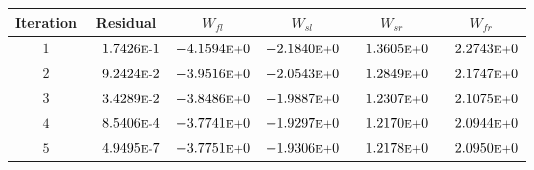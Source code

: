 \begin{tabular*}{\textwidth}{@{\extracolsep{\fill}} cccccc}
\\ 
\hline 
\hline 
Iteration & Residual & $W_{fl}$ & $W_{sl}$ & $W_{sr}$ & $W_{fr}$ \\ 
\hline 
$1$ & $\phantom{-} 1.7426\mbox{\sc{e}\smaller{-}}1$ & $-4.1594\mbox{\sc{e}\smaller{+}}0$ & $-2.1840\mbox{\sc{e}\smaller{+}}0$ & $\phantom{-} 1.3605\mbox{\sc{e}\smaller{+}}0$ & $\phantom{-} 2.2743\mbox{\sc{e}\smaller{+}}0$ \\ 
$2$ & $\phantom{-} 9.2424\mbox{\sc{e}\smaller{-}}2$ & $-3.9516\mbox{\sc{e}\smaller{+}}0$ & $-2.0543\mbox{\sc{e}\smaller{+}}0$ & $\phantom{-} 1.2849\mbox{\sc{e}\smaller{+}}0$ & $\phantom{-} 2.1747\mbox{\sc{e}\smaller{+}}0$ \\ 
$3$ & $\phantom{-} 3.4289\mbox{\sc{e}\smaller{-}}2$ & $-3.8486\mbox{\sc{e}\smaller{+}}0$ & $-1.9887\mbox{\sc{e}\smaller{+}}0$ & $\phantom{-} 1.2307\mbox{\sc{e}\smaller{+}}0$ & $\phantom{-} 2.1075\mbox{\sc{e}\smaller{+}}0$ \\ 
$4$ & $\phantom{-} 8.5406\mbox{\sc{e}\smaller{-}}4$ & $-3.7741\mbox{\sc{e}\smaller{+}}0$ & $-1.9297\mbox{\sc{e}\smaller{+}}0$ & $\phantom{-} 1.2170\mbox{\sc{e}\smaller{+}}0$ & $\phantom{-} 2.0944\mbox{\sc{e}\smaller{+}}0$ \\ 
$5$ & $\phantom{-} 4.9495\mbox{\sc{e}\smaller{-}}7$ & $-3.7751\mbox{\sc{e}\smaller{+}}0$ & $-1.9306\mbox{\sc{e}\smaller{+}}0$ & $\phantom{-} 1.2178\mbox{\sc{e}\smaller{+}}0$ & $\phantom{-} 2.0950\mbox{\sc{e}\smaller{+}}0$ \\ 
\hline 
\end{tabular*} 
